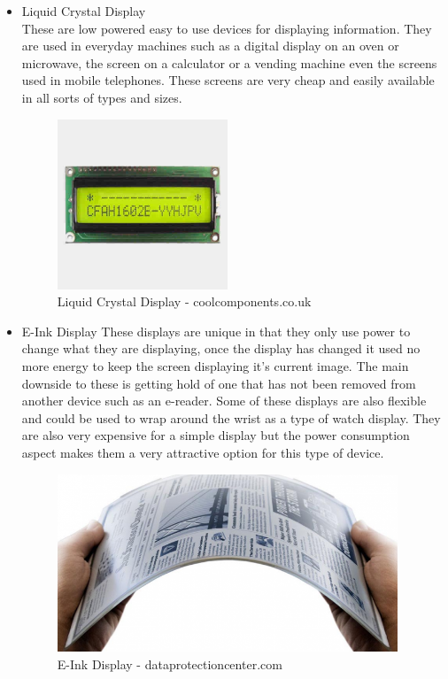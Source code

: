 \begin{itemize}
\item Liquid Crystal Display
\\These are low powered easy to use devices for displaying information.  They are used in everyday machines such as a digital display on an oven or microwave, the screen on a calculator or a vending machine even the screens used in mobile telephones.  These screens are very cheap and easily available in all sorts of types and sizes.
\begin{figure}[H]
\centering
        \includegraphics[width=2.0in] {Images/lcd.jpg}
        \caption{Liquid Crystal Display - coolcomponents.co.uk}
        \label{Liquid Crystal Display}
\end{figure}
\item E-Ink Display
These displays are unique in that they only use power to change what they are displaying, once the display has changed it used no more energy to keep the screen displaying it's current image.  The main downside to these is getting hold of one that has not been removed from another device such as an e-reader.  Some of these displays are also flexible and could be used to wrap around the wrist as a type of watch display.  They are also very expensive for a simple display but the power consumption aspect makes them a very attractive option for this type of device.
\begin{figure}[H]
\centering
        \includegraphics[width=4.0in] {Images/e-ink-display.png}
        \caption{E-Ink Display - dataprotectioncenter.com}
        \label{E-Ink Display}
\end{figure}
\end{itemize}
